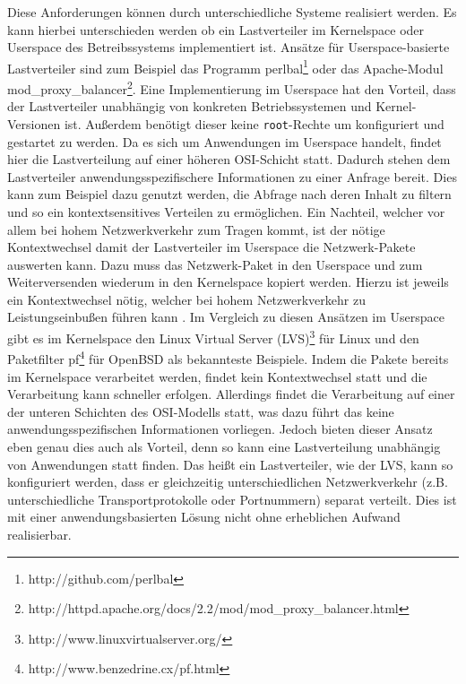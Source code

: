 \documentclass[a4paper, 12pt, BCOR10mm, DIV12, toc=bibliography, toc=listof, german]{scrbook}
\begin{document}
			Diese Anforderungen können durch unterschiedliche Systeme realisiert werden. Es kann hierbei
			unterschieden werden ob ein Lastverteiler im Kernelspace oder Userspace des Betreibssystems
			implementiert ist. Ansätze für Userspace-basierte Lastverteiler sind zum Beispiel das Programm
			perlbal\footnote{http://github.com/perlbal} oder das Apache-Modul
			mod\_proxy\_balancer\footnote{http://httpd.apache.org/docs/2.2/mod/mod\_proxy\_balancer.html}.
			Eine Implementierung im Userspace hat den Vorteil, dass der Lastverteiler unabhängig von
			konkreten Betriebssystemen und Kernel-Versionen ist. Außerdem benötigt dieser keine
			\texttt{root}-Rechte um konfiguriert und gestartet zu werden. Da es sich um Anwendungen im
			Userspace handelt, findet hier die Lastverteilung auf einer höheren OSI-Schicht
			\cite{tanenbaum1988} statt. Dadurch stehen dem Lastverteiler anwendungsspezifischere
			Informationen zu einer Anfrage bereit. Dies kann zum Beispiel dazu genutzt werden, die
			Abfrage nach deren Inhalt zu filtern und so ein kontextsensitives Verteilen zu ermöglichen.
			Ein Nachteil, welcher vor allem bei hohem Netzwerkverkehr zum Tragen kommt, ist der nötige
			Kontextwechsel damit der Lastverteiler im Userspace die Netzwerk-Pakete auswerten kann. Dazu
			muss das Netzwerk-Paket in den Userspace und zum Weiterversenden wiederum in den
			Kernelspace kopiert werden. Hierzu ist jeweils ein Kontextwechsel nötig, welcher bei hohem
			Netzwerkverkehr zu Leistungseinbußen führen kann \cite{boehme2006}.  Im Vergleich zu diesen
			Ansätzen im Userspace gibt es im Kernelspace den Linux Virtual Server
			(LVS)\footnote{http://www.linuxvirtualserver.org/} \cite{zhang2000} für Linux und den
			Paketfilter pf\footnote{http://www.benzedrine.cx/pf.html} für OpenBSD als bekannteste
			Beispiele. Indem die Pakete bereits im Kernelspace verarbeitet werden, findet kein
			Kontextwechsel statt und die Verarbeitung kann schneller erfolgen. Allerdings findet die
			Verarbeitung auf einer der unteren Schichten des OSI-Modells statt, was dazu führt das keine
			anwendungsspezifischen Informationen vorliegen. Jedoch bieten dieser Ansatz eben genau dies
			auch als Vorteil, denn so kann eine Lastverteilung unabhängig von Anwendungen statt finden.
			Das heißt ein Lastverteiler, wie der LVS, kann so konfiguriert werden, dass er gleichzeitig
			unterschiedlichen Netzwerkverkehr (z.B. unterschiedliche Transportprotokolle oder Portnummern)
			separat verteilt. Dies ist mit einer anwendungsbasierten Lösung nicht ohne erheblichen
			Aufwand realisierbar.
\end{document}

